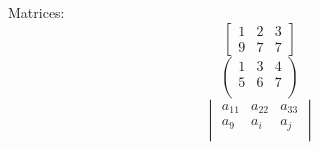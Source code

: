 \documentclass[a4paper,10pt]{article}
\begin{document}
Matrices:
\begin{equation}
\begin{bmatrix}
1 & 2 & 3 \\
9& 7 & 7
\end{bmatrix}
\end{equation}
\begin{equation}
\begin{pmatrix}
1 & 3 & 4 \\
5 & 6 & 7 \\
\end{pmatrix}
\end{equation}
\begin{equation}
\begin{vmatrix}
a_{11} & a_{22} & a_{33} \\
a_9 & a_i & a_j \\
\end{vmatrix}
\end{equation}
\end{document}
